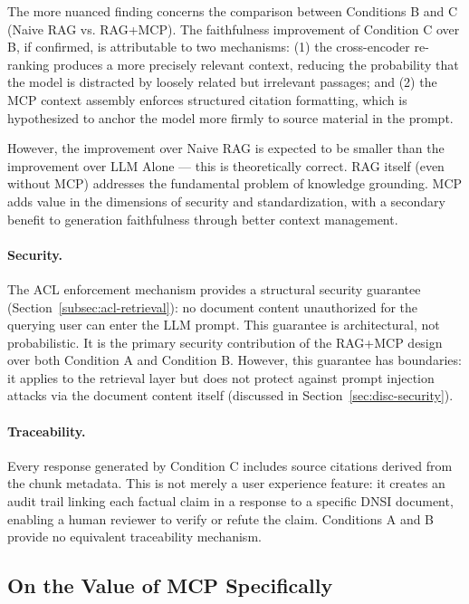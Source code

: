 The more nuanced finding concerns the comparison between Conditions B and C (Naive RAG vs. RAG+MCP). The faithfulness improvement of Condition C over B, if confirmed, is attributable to two mechanisms: (1) the cross-encoder re-ranking produces a more precisely relevant context, reducing the probability that the model is distracted by loosely related but irrelevant passages; and (2) the MCP context assembly enforces structured citation formatting, which is hypothesized to anchor the model more firmly to source material in the prompt.

However, the improvement over Naive RAG is expected to be smaller than the improvement over LLM Alone — this is theoretically correct. RAG itself (even without MCP) addresses the fundamental problem of knowledge grounding. MCP adds value in the dimensions of security and standardization, with a secondary benefit to generation faithfulness through better context management.

\paragraph{Security.} The ACL enforcement mechanism provides a structural security guarantee (Section~\ref{subsec:acl-retrieval}): no document content unauthorized for the querying user can enter the LLM prompt. This guarantee is architectural, not probabilistic. It is the primary security contribution of the RAG+MCP design over both Condition A and Condition B. However, this guarantee has boundaries: it applies to the retrieval layer but does not protect against prompt injection attacks via the document content itself \citep{Perez2022, Greshake2023} (discussed in Section~\ref{sec:disc-security}).

\paragraph{Traceability.} Every response generated by Condition C includes source citations derived from the chunk metadata. This is not merely a user experience feature: it creates an audit trail linking each factual claim in a response to a specific DNSI document, enabling a human reviewer to verify or refute the claim. Conditions A and B provide no equivalent traceability mechanism.

\subsection{On the Value of MCP Specifically}

